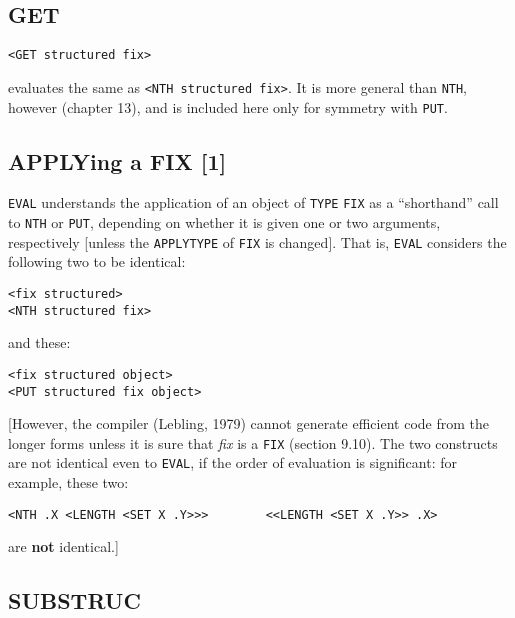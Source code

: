 \documentclass[a4paper]{scrbook}
\begin{document}
\subsection{GET}\label{get}

\begin{verbatim}
<GET structured fix>
\end{verbatim}

 evaluates the same as \texttt{\textless{}NTH\ structured\ fix\textgreater{}}. It is more
general than \texttt{NTH}, however (chapter 13), and is included here only for symmetry with \texttt{PUT}.

\subsection{APPLYing a FIX {[}1{]}}\label{applying-a-fix-1}

\texttt{EVAL} understands the application of an object of \texttt{TYPE} \texttt{FIX} as a ``shorthand''
call to \texttt{NTH} or \texttt{PUT}, depending on whether it is given one or two arguments, respectively {[}unless the
\texttt{APPLYTYPE} of \texttt{FIX} is changed{]}. That is, \texttt{EVAL} considers the following two to be identical:

\begin{verbatim}
<fix structured>
<NTH structured fix>
\end{verbatim}

and these:

\begin{verbatim}
<fix structured object>
<PUT structured fix object>
\end{verbatim}

{[}However, the compiler (Lebling, 1979) cannot generate efficient code from the longer forms unless it is sure that
\emph{fix} is a \texttt{FIX} (section 9.10). The two constructs are not identical even to \texttt{EVAL}, if the order of
evaluation is significant: for example, these two:

\begin{verbatim}
<NTH .X <LENGTH <SET X .Y>>>        <<LENGTH <SET X .Y>> .X>
\end{verbatim}

are \textbf{not} identical.{]}

\subsection{SUBSTRUC}\label{substruc}
\end{document}
